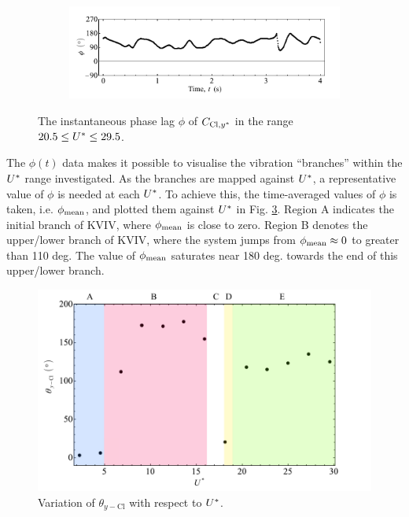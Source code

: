 \documentclass[oneside]{utmthesis}
\begin{document}
\begin{figure} \continuedfloat
  \centering
  \begin{subfigure}[h]{1\textwidth}
    \includegraphics[width=\textwidth]{figs/phaseAngle-e}
    \caption{}
    \label{fig:phaseAngle-e}
  \end{subfigure}
  \caption{The instantaneous phase lag $\phi$ of $C_{\text{Cl},y^{*}}$ in the range $20.5 \leq U^{*} \leq 29.5$.}
  \label{fig:phaseAngle}
\end{figure}

The $\phi(t)$ data makes it possible to visualise the vibration ``branches'' within the $U^{*}$ range investigated. As the branches are mapped against $U^{*}$, a representative value of $\phi$ is needed at each $U^{*}$. To achieve this, the time-averaged values of $\phi$ is taken, i.e. $\phi_{\text{mean}}$, and plotted them against $U^{*}$ in Fig. \ref{fig:phaseAngleRegime}. Region A indicates the initial branch of  KVIV, where  $\phi_{\text{mean}}$ is close to zero. Region B denotes the upper/lower branch of  KVIV, where the system jumps from  $\phi_{\text{mean}} \approx 0$ to greater than 110 deg. The value of $\phi_{\text{mean}}$ saturates near 180 deg. towards the end of this upper/lower branch.

\begin{figure}
  \centering
  \includegraphics[width=1\textwidth]{figs/phaseAngleRegime}
  \caption{Variation of $\theta_{y-\text{Cl}}$ with respect to $U^{*}$.}
  \label{fig:phaseAngleRegime}
\end{figure}
\end{document}
